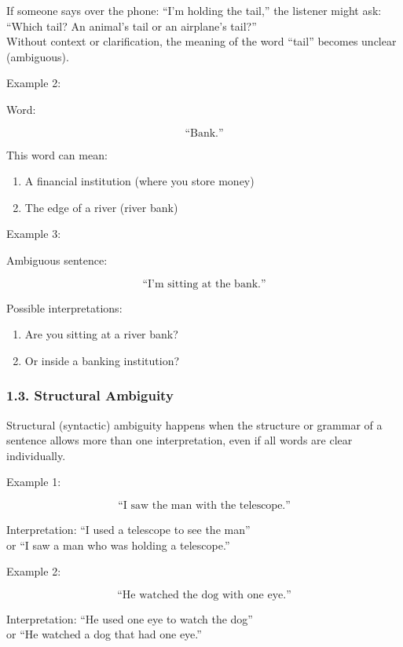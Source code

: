 If someone says over the phone: ``I'm holding the tail,'' the listener
might ask: ``Which tail? An animal's tail or an airplane's tail?''\\
Without context or clarification, the meaning of the word ``tail''
becomes unclear (ambiguous).

Example 2:

Word:

\[\text{“Bank.”}\]

This word can mean:

\begin{enumerate}
\def\labelenumi{\arabic{enumi}.}
\tightlist
\item
  A financial institution (where you store money)
\item
  The edge of a river (river bank)
\end{enumerate}

Example 3:

Ambiguous sentence:

\[\text{“I’m sitting at the bank.”}\]

Possible interpretations:

\begin{enumerate}
\def\labelenumi{\arabic{enumi}.}
\tightlist
\item
  Are you sitting at a river bank?
\item
  Or inside a banking institution?
\end{enumerate}

\subsubsection{1.3. Structural Ambiguity}\label{structural-ambiguity}

Structural (syntactic) ambiguity happens when the structure or grammar
of a sentence allows more than one interpretation, even if all words are
clear individually.

Example 1:

\[\text{“I saw the man with the telescope.”}\]

Interpretation: ``I used a telescope to see the man''\\
or ``I saw a man who was holding a telescope.''

Example 2:

\[\text{“He watched the dog with one eye.”}\]

Interpretation: ``He used one eye to watch the dog''\\
or ``He watched a dog that had one eye.''

